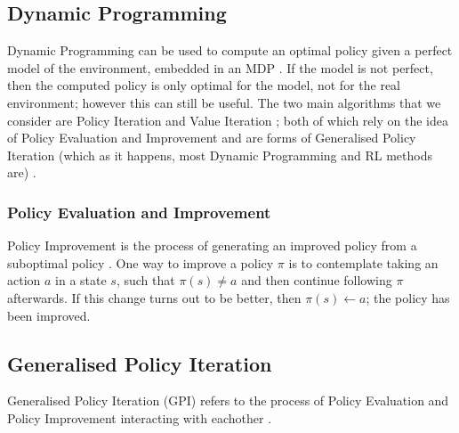 \subsection{Dynamic Programming}
Dynamic Programming \citep{Bellman:1957, DBLP:books/lib/Bertsekas05} can be used to compute an optimal policy given a perfect model of the environment, embedded in an MDP \citep{Sutton1998}. If the model is not perfect, then the computed policy is only optimal for the model, not for the real environment; however this can still be useful. The two main algorithms that we consider are Policy Iteration \citep{Bellman:1957, howard:dp} and Value Iteration \citep{Bellman:1957}; both of which rely on the idea of Policy Evaluation and Improvement \citep{Bellman:1957} and are forms of Generalised Policy Iteration (which as it happens, most Dynamic Programming and RL methods are) \cite{Sutton1998}.
\subsubsection{Policy Evaluation and Improvement}
Policy Improvement \citep{Bellman:1957} is the process of generating an improved policy from a suboptimal policy \citep{DBLP:books/lib/Bertsekas05}. One way to improve a policy $\pi$ is to contemplate taking an action $a$ in a state $s$, such that $\pi(s) \neq a$ and then continue following $\pi$ afterwards. If this change turns out to be better, then $\pi(s) \leftarrow a$; the policy has been improved.
\subsection{Generalised Policy Iteration}
Generalised Policy Iteration (GPI) refers to the process of Policy Evaluation and Policy Improvement interacting with eachother \cite{Sutton1998}.
